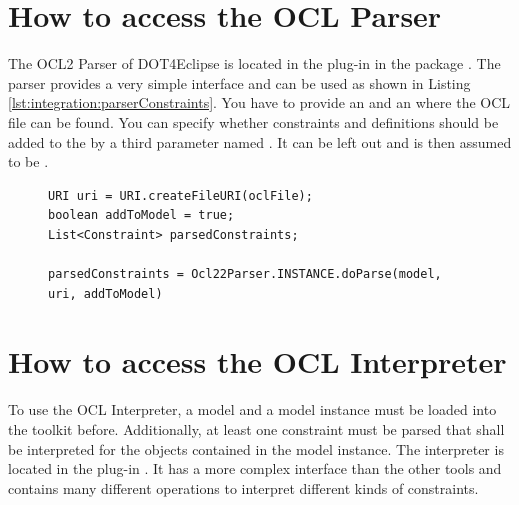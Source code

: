 \section{How to access the OCL Parser}
The \acs{OCL}2 Parser of \acl{DOT4Eclipse} is located in the plug-in 
 in the
package . The parser
provides a very simple interface and can be used as shown in Listing 
\ref{lst:integration:parserConstraints}. You have to provide an 
and an  where the \acs{OCL} file can be found. You can specify whether
constraints and definitions should be added to the  by a third
parameter named . It can be left out and is then assumed to be
.

\begin{figure}[!b]
\begin{lstlisting}[caption={How to parse constraints.}, captionpos=b, label=lst:integration:parserConstraints]
URI uri = URI.createFileURI(oclFile);
boolean addToModel = true;
List<Constraint> parsedConstraints;

parsedConstraints = Ocl22Parser.INSTANCE.doParse(model, uri, addToModel)
\end{lstlisting}
\end{figure}



\section{How to access the OCL Interpreter}

To use the \acs{OCL} Interpreter, a model and a model instance must be loaded 
into the toolkit before. Additionally, at least one constraint must be parsed 
that shall be interpreted for the objects contained in the model instance. The 
interpreter is located in the plug-in 
. It has a more 
complex interface than the other tools and contains many different operations 
to interpret different kinds of constraints.

